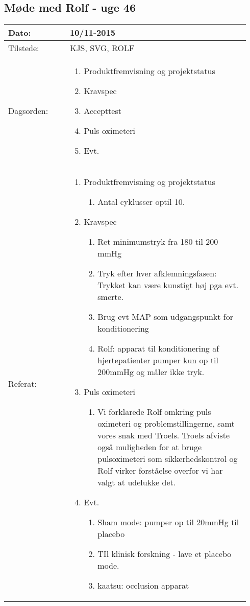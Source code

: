 	\subsection{Møde med Rolf - uge 46}
	\begin{longtable}{|p{0.24\linewidth}|p{0.7\linewidth}|}
		\hline
		Dato: & 10/11-2015\\ \hline
		Tilstede: & KJS, SVG, ROLF\\ \hline
		Dagsorden: &
		\begin{enumerate}
			\item Produktfremvisning og projektstatus
			\item Kravspec
			\item Accepttest 
			\item Puls oximeteri
			\item Evt.
		\end{enumerate}
		\\ \hline
		Referat: & 
		\begin{enumerate}
			\item Produktfremvisning og projektstatus
			\begin{enumerate}
				\item Antal cyklusser optil 10. 
			\end{enumerate}
			\item Kravspec
			\begin{enumerate}
				\item Ret minimumstryk fra 180 til 200 mmHg
				\item Tryk efter hver afklemningsfasen: Trykket kan være kunstigt høj pga evt. smerte.
				\item Brug evt MAP som udgangspunkt for konditionering
				\item Rolf: apparat til konditionering af hjertepatienter pumper kun op til 200mmHg og måler ikke tryk. 
			\end{enumerate}
			\item Puls oximeteri
			\begin{enumerate}
				\item Vi forklarede Rolf omkring puls oximeteri og problemstillingerne, samt vores snak med Troels. Troels afviste også muligheden for at bruge pulsoximeteri som sikkerhedskontrol og Rolf virker forståelse overfor vi har valgt at udelukke det. 
			\end{enumerate}
			\item Evt.
			\begin{enumerate}
				\item Sham mode: pumper op til 20mmHg til placebo 
				\item TIl klinisk forskning - lave et placebo mode. 
				\item kaatsu: occlusion apparat
			\end{enumerate}
		\end{enumerate}
		\\ \hline
	\end{longtable}
	
